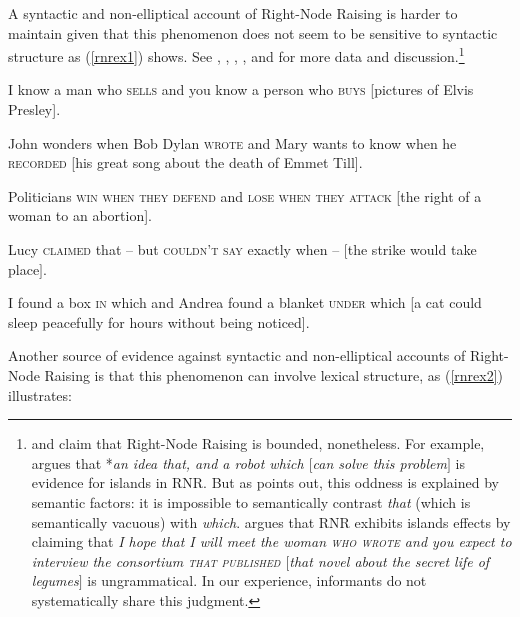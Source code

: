 {A syntactic and non-elliptical account of Right-Node Raising is harder to maintain given that this phenomenon does not seem to be sensitive to  syntactic structure as (\ref{rnrex1}) shows. See 
\citet{bresnan74}, \citet[299]{wexlercull},  \citet[45]{grosu81}, \citet{mccawley}, and \citet[382, footnote 30]{sab}
for more data and discussion.\footnote{\citet{steedman85,gapsteed,steedmanbook}
and \citet[183]{dowty88} claim that
Right-Node Raising is bounded, nonetheless.
For example, \citet{
dowty88} argues that  *\emph{an idea that, and a robot which $[$can solve this problem$]$} is  evidence for islands in RNR. But as \citet[95]{phil}
 points out, this oddness is explained by semantic factors: it is impossible to   semantically contrast \emph{that} (which is semantically vacuous) with \emph{which}.
 \citet[17]{steedmanbook}   argues that RNR
exhibits islands effects by claiming that \emph{I hope that I will meet the woman
\textsc{who wrote} and you expect to interview the
consortium \textsc{that published} $[$that
novel about the secret life of legumes$]$} is ungrammatical.
In our experience, informants do not systematically share this judgment.}


\begin{exe}
\ex
\begin{xlista}
\ex  I know a man who \textsc{sells} and you know a person who \textsc{buys}
                     [pictures of Elvis Presley].

\ex John wonders when Bob Dylan
\textsc{wrote} and Mary wants to know when
  he
\textsc{recorded} [his great song about the death of Emmet Till].
 
 \ex Politicians \textsc{win when they defend} and \textsc{lose when they attack}
[the right of a woman to an abortion].

\ex Lucy \textsc{claimed} that -- but \textsc{couldn't say}
exactly when --  $[$the strike would take place$]$.
 
 \ex I found a box \textsc{in} which and Andrea found a blanket \textsc{under}
which [a cat could sleep peacefully for hours without being
noticed].
\end{xlista}\label{rnrex1}
\end{exe}

Another source of evidence against syntactic and non-elliptical accounts of Right-Node Raising is that this phenomenon can involve lexical structure,
as  (\ref{rnrex2}) illustrates:

}
